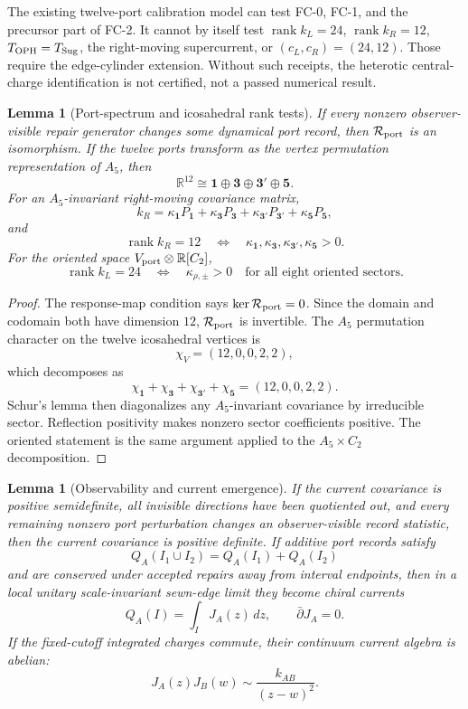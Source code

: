 \documentclass[11pt]{article}
\newtheorem{lemma}[theorem]{Lemma}
\theoremstyle{remark}
\theoremstyle{plain}
\newcommand{\OPH}{\mathrm{OPH}}
\newcommand{\calR}{\mathcal R}
\begin{document}
The existing twelve-port calibration model can test FC-0, FC-1, and the precursor part of FC-2. It cannot
by itself test \(\operatorname{rank}k_L=24\), \(\operatorname{rank}k_R=12\), \(T_{\OPH}=T_{\rm Sug}\),
the right-moving supercurrent, or \((c_L,c_R)=(24,12)\). Those require the edge-cylinder extension.
Without such receipts, the heterotic central-charge identification is not certified,
not a passed numerical result.

\begin{lemma}[Port-spectrum and icosahedral rank tests]
If every nonzero observer-visible repair generator changes some dynamical port record, then
\(\calR_{\rm port}\) is an isomorphism. If the twelve ports transform as the vertex permutation
representation of \(A_5\), then
\[
\mathbb R^{12}\cong\mathbf1\oplus\mathbf3\oplus\mathbf3'\oplus\mathbf5.
\]
For an \(A_5\)-invariant right-moving covariance matrix,
\[
k_R=\kappa_{\mathbf1}P_{\mathbf1}
+\kappa_{\mathbf3}P_{\mathbf3}
+\kappa_{\mathbf3'}P_{\mathbf3'}
+\kappa_{\mathbf5}P_{\mathbf5},
\]
and
\[
\operatorname{rank}k_R=12
\quad\Longleftrightarrow\quad
\kappa_{\mathbf1},\kappa_{\mathbf3},\kappa_{\mathbf3'},\kappa_{\mathbf5}>0.
\]
For the oriented space \(V_{\rm port}\otimes\mathbb R[C_2]\),
\[
\operatorname{rank}k_L=24
\quad\Longleftrightarrow\quad
\kappa_{\rho,\pm}>0
\quad\text{for all eight oriented sectors.}
\]
\end{lemma}

\begin{proof}
The response-map condition says \(\ker\calR_{\rm port}=0\). Since the domain and codomain both
have dimension \(12\), \(\calR_{\rm port}\) is invertible. The \(A_5\) permutation character on the
twelve icosahedral vertices is
\[
\chi_V=(12,0,0,2,2),
\]
which decomposes as
\[
\chi_{\mathbf1}+\chi_{\mathbf3}+\chi_{\mathbf3'}+\chi_{\mathbf5}
=(12,0,0,2,2).
\]
Schur's lemma then diagonalizes any \(A_5\)-invariant covariance by irreducible sector. Reflection
positivity makes nonzero sector coefficients positive. The oriented statement is the same argument
applied to the \(A_5\times C_2\) decomposition.
\end{proof}

\begin{lemma}[Observability and current emergence]
If the current covariance is positive semidefinite, all invisible directions have been quotiented
out, and every remaining nonzero port perturbation changes an observer-visible record statistic,
then the current covariance is positive definite. If additive port records satisfy
\[
Q_A(I_1\cup I_2)=Q_A(I_1)+Q_A(I_2)
\]
and are conserved under accepted repairs away from interval endpoints, then in a local unitary
scale-invariant sewn-edge limit they become chiral currents
\[
Q_A(I)=\int_I J_A(z)\,dz,
\qquad
\bar\partial J_A=0.
\]
If the fixed-cutoff integrated charges commute, their continuum current algebra is abelian:
\[
J_A(z)J_B(w)\sim\frac{k_{AB}}{(z-w)^2}.
\]
\end{lemma}
\end{document}
